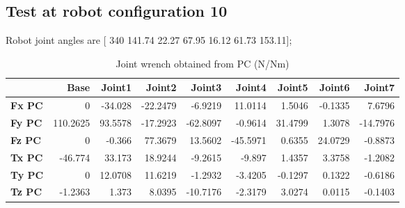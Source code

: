 
\subsection{Test at robot configuration 10}
Robot joint angles are  [ 340        141.74         22.27         67.95         16.12         61.73        153.11];

\begin{table}[h!]
	\centering
	\caption{Joint wrench obtained from PC (N/Nm)}
	\label{wrech_PC_Pose10}
	\begin{tabular}{|l|r|r|r|r|r|r|r|r|}
		\hline
		\textbf{}  & \textbf{Base} & \textbf{Joint1}  & \textbf{Joint2}  & \textbf{Joint3}  & \textbf{Joint4}  & \textbf{Joint5}  & \textbf{Joint6}  & \textbf{Joint7} \\ \hline
		\textbf{Fx PC}  & 0        & -34.028        & -22.2479        & -6.9219        & 11.0114        & 1.5046        & -0.1335        & 7.6796 \\ \hline
		\textbf{Fy PC}  & 110.2625        & 93.5578        & -17.2923        & -62.8097        & -0.9614        & 31.4799        & 1.3078        & -14.7976 \\ \hline
		\textbf{Fz PC}  & 0        & -0.366        & 77.3679        & 13.5602        & -45.5971        & 0.6355        & 24.0729        & -0.8873 \\ \hline
		\textbf{Tx PC}  & -46.774        & 33.173        & 18.9244        & -9.2615        & -9.897        & 1.4357        & 3.3758        & -1.2082 \\ \hline
		\textbf{Ty PC}  & 0        & 12.0708        & 11.6219        & -1.2932        & -3.4205        & -0.1297        & 0.1322        & -0.6186 \\ \hline
		\textbf{Tz PC}  & -1.2363        & 1.373        & 8.0395        & -10.7176        & -2.3179        & 3.0274        & 0.0115        & -0.1403 \\ \hline
	\end{tabular}
\end{table}

